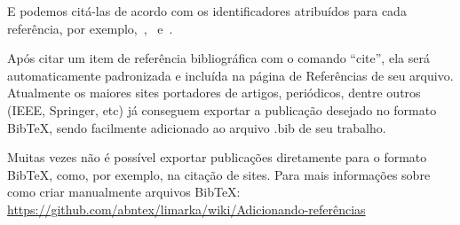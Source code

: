 E podemos citá-las de acordo com os identificadores atribuídos para cada referência, por exemplo,~\cite{stonebraker93},~\cite{rocha09} e~\cite{keras}.

Após citar um item de referência bibliográfica com o comando ``cite'', ela será automaticamente padronizada e incluída na página de Referências de seu arquivo. Atualmente os maiores sites portadores de artigos, periódicos, dentre outros (IEEE, Springer, etc) já conseguem exportar a publicação desejado no formato BibTeX, sendo facilmente adicionado ao arquivo .bib de seu trabalho.

Muitas vezes não é possível exportar publicações diretamente para o formato BibTeX, como, por exemplo, na citação de sites. Para mais informações sobre como criar manualmente arquivos BibTeX: \url{https://github.com/abntex/limarka/wiki/Adicionando-referências}
